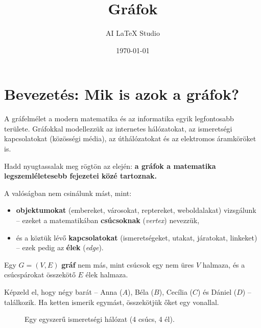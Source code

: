 \documentclass[a4paper,12pt]{article}
\title{Gráfok}
\author{AI LaTeX Studio}
\date{\today}
\newcommand{\textbfr}[1]{\textbf{\textcolor{bvred}{#1}}} %
\theoremstyle{definition} %
\begin{document}
\maketitle

\section{Bevezetés: Mik is azok a gráfok?}

A gráfelmélet a modern matematika és az informatika egyik legfontosabb területe. Gráfokkal modellezzük az internetes hálózatokat, az ismeretségi kapcsolatokat (közösségi média), az úthálózatokat és az elektromos áramköröket is.

Hadd nyugtassalak meg rögtön az elején: \textbf{a gráfok a matematika legszemléletesebb fejezetei közé tartoznak.}

A valóságban nem csinálunk mást, mint:
\begin{itemize}[leftmargin=2em]
    \item \textbf{objektumokat} (embereket, városokat, reptereket, weboldalakat) vizsgálunk – ezeket a matematikában \textbfr{csúcsoknak} (\textit{vertex}) nevezzük,
    \item és a köztük lévő \textbf{kapcsolatokat} (ismeretségeket, utakat, járatokat, linkeket) – ezek pedig az \textbfr{élek} (\textit{edge}).
\end{itemize}

\begin{definiciodoboz}
Egy $G = (V, E)$ \textbf{gráf} nem más, mint csúcsok egy nem üres $V$ halmaza, és a csúcspárokat összekötő $E$ élek halmaza.
\end{definiciodoboz}

Képzeld el, hogy négy barát – Anna ($A$), Béla ($B$), Cecília ($C$) és Dániel ($D$) – találkozik. Ha ketten ismerik egymást, összekötjük őket egy vonallal.

\begin{figure}[H]
    \centering
    \caption{Egy egyszerű ismeretségi hálózat (4 csúcs, 4 él).}
    \label{fig:intro_graph}
\end{figure}
\end{document}
